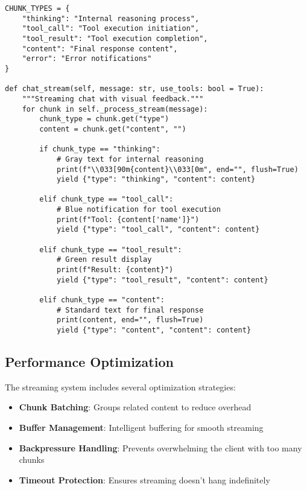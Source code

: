 \documentclass{article}
\begin{document}
\begin{lstlisting}[caption=Streaming Chunk Processing]
CHUNK_TYPES = {
    "thinking": "Internal reasoning process",
    "tool_call": "Tool execution initiation",
    "tool_result": "Tool execution completion",
    "content": "Final response content",
    "error": "Error notifications"
}

def chat_stream(self, message: str, use_tools: bool = True):
    """Streaming chat with visual feedback."""
    for chunk in self._process_stream(message):
        chunk_type = chunk.get("type")
        content = chunk.get("content", "")

        if chunk_type == "thinking":
            # Gray text for internal reasoning
            print(f"\\033[90m{content}\\033[0m", end="", flush=True)
            yield {"type": "thinking", "content": content}

        elif chunk_type == "tool_call":
            # Blue notification for tool execution
            print(f"Tool: {content['name']}")
            yield {"type": "tool_call", "content": content}

        elif chunk_type == "tool_result":
            # Green result display
            print(f"Result: {content}")
            yield {"type": "tool_result", "content": content}

        elif chunk_type == "content":
            # Standard text for final response
            print(content, end="", flush=True)
            yield {"type": "content", "content": content}
\end{lstlisting}

\subsection{Performance Optimization}

The streaming system includes several optimization strategies:

\begin{itemize}
    \item \textbf{Chunk Batching}: Groups related content to reduce overhead
    \item \textbf{Buffer Management}: Intelligent buffering for smooth streaming
    \item \textbf{Backpressure Handling}: Prevents overwhelming the client with too many chunks
    \item \textbf{Timeout Protection}: Ensures streaming doesn't hang indefinitely
\end{itemize}
\end{document}
